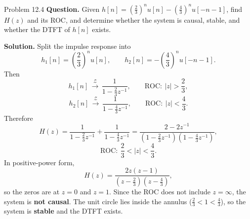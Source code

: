 \documentclass[10pt]{article}
\newcommand{\ROC}{\mathrm{ROC}}
\newcommand{\ZT}{\mathcal{Z}}
\newcommand{\Prompt}[1]{\textbf{Question.} #1}
\newcommand{\SketchLabel}{\tcblower\textbf{Solution.}}
\newcommand{\Zpair}[2]{#1\,\mathrel{\overset{\ZT}{\longrightarrow}}\,#2}
\begin{document}
\begin{examplebox}{Problem 12.4}
  \Prompt{Given \(h[n]=\left(\frac23\right)^n u[n]-\left(\frac43\right)^n u[-n-1]\), find \(H(z)\) and its ROC, and determine whether the system is causal, stable, and whether the DTFT of \(h[n]\) exists.}

  \medskip
  \SketchLabel{}
  Split the impulse response into
  \[
    h_1[n]=\left(\frac23\right)^n u[n],
    \qquad
    h_2[n]=-\left(\frac43\right)^n u[-n-1].
  \]
  Then
  \[
    \Zpair{h_1[n]}{\frac{1}{1-\frac23 z^{-1}}},
    \qquad
    \ROC:\ |z|>\frac23,
  \]
  \[
    \Zpair{h_2[n]}{\frac{1}{1-\frac43 z^{-1}}},
    \qquad
    \ROC:\ |z|<\frac43.
  \]
  Therefore
  \[
    H(z)=\frac{1}{1-\frac23 z^{-1}}+\frac{1}{1-\frac43 z^{-1}}
    =\frac{2-2z^{-1}}{(1-\frac23 z^{-1})(1-\frac43 z^{-1})},
  \]
  \[
    \ROC:\ \frac23<|z|<\frac43.
  \]
  In positive-power form,
  \[
    H(z)=\frac{2z(z-1)}{\left(z-\frac23\right)\left(z-\frac43\right)},
  \]
  so the zeros are at \(z=0\) and \(z=1\).
  Since the ROC does not include \(z=\infty\), the system is \textbf{not causal}. The unit circle lies inside the annulus (\(\frac23<1<\frac43\)), so the system is \textbf{stable} and the DTFT exists.

  \begin{center}
  \end{center}
\end{examplebox}
\end{document}
